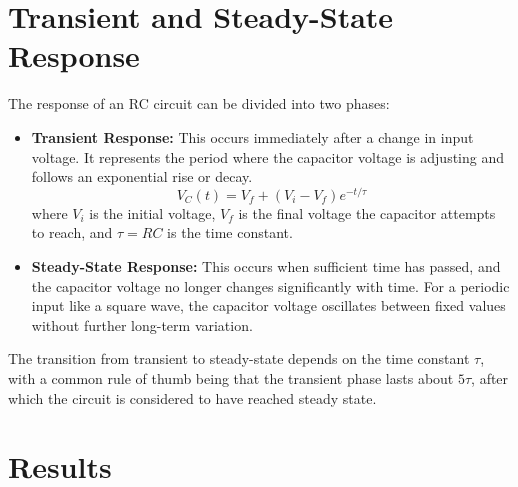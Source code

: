 \documentclass[12pt,a4paper]{report}
\begin{document}
\section*{Transient and Steady-State Response}
The response of an RC circuit can be divided into two phases:
\begin{itemize}
    \item \textbf{Transient Response:} This occurs immediately after a change in input voltage. It represents the period where the capacitor voltage is adjusting and follows an exponential rise or decay.
    \begin{equation}
        V_C(t) = V_f + (V_i - V_f) e^{-t/\tau}
    \end{equation}
     where \( V_i \) is the initial voltage, \( V_f \) is the final voltage the capacitor attempts to reach, and \( \tau = RC \) is the time constant.
   
    
    \item \textbf{Steady-State Response:} This occurs when sufficient time has passed, and the capacitor voltage no longer changes significantly with time. For a periodic input like a square wave, the capacitor voltage oscillates between fixed values without further long-term variation.
\end{itemize}

The transition from transient to steady-state depends on the time constant \( \tau \), with a common rule of thumb being that the transient phase lasts about \( 5\tau \), after which the circuit is considered to have reached steady state.

\section{Results}
\end{document}

